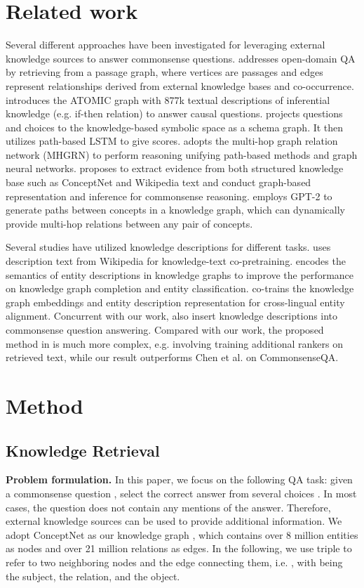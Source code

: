 \documentclass[11pt,a4paper]{article}
\begin{document}
\section{Related work}
\label{sec:rw}
Several different approaches have been investigated for leveraging external knowledge sources to answer commonsense questions. 
\citet{min2019knowledge} addresses open-domain QA by retrieving from a passage graph, where vertices are passages and edges represent relationships derived from external knowledge bases and co-occurrence. \citet{sap2019atomic} introduces the ATOMIC graph with 877k textual descriptions of inferential knowledge (e.g. if-then relation) to answer causal questions. \citet{kagnet} projects questions and choices to the knowledge-based symbolic space as a schema graph. It then utilizes path-based LSTM to give scores. \citet{feng2020scalable} adopts the multi-hop graph relation network (MHGRN) to perform reasoning unifying path-based methods and graph neural networks. \citet{lv2020graph} proposes to extract evidence from both structured knowledge base such as ConceptNet and Wikipedia text and conduct graph-based representation and inference for commonsense reasoning. \citet{wang2020connecting} employs GPT-2 to generate paths between concepts in a knowledge graph, which can dynamically provide multi-hop relations between any pair of concepts.

Several studies have utilized knowledge descriptions for different tasks. \citet{yu2020jaket} uses description text from Wikipedia for knowledge-text co-pretraining. \citet{xie2016representation} encodes the semantics of entity descriptions in knowledge graphs to improve the performance on knowledge graph completion and entity classification. \citet{chen2018co} co-trains the knowledge graph embeddings and entity description representation for cross-lingual entity alignment. Concurrent with our work, \citet{chen-etal-2020-improving-commonsense} also insert knowledge descriptions into commonsense question answering. Compared with our work, the proposed method in \citet{chen-etal-2020-improving-commonsense} is much more complex, e.g. involving training additional rankers on retrieved text, while our result outperforms Chen et al. on CommonsenseQA. 


\section{Method}
\label{sec:method}
\subsection{Knowledge Retrieval}
\label{sec:form}
\textbf{Problem formulation.} In this paper, we focus on the following QA task: given a commonsense question , select the correct answer from several choices . In most cases, the question does not contain any mentions of the answer. Therefore, external knowledge sources can be used to provide additional information. We adopt ConceptNet \citep{conceptnet} as our knowledge graph , which contains over 8 million entities as nodes and over 21 million relations as edges. In the following, we use triple to refer to two neighboring nodes and the edge connecting them, i.e. , with  being the subject,  the relation, and  the object.
\end{document}
